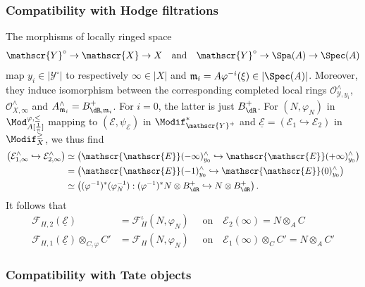 \subsubsection{Compatibility with Hodge filtrations}\label{subsec:CompHodge}

The morphisms of locally ringed space
\[
\mathscr{Y}^{\circ}\rightarrow\mathscr{X}\rightarrow X\quad\text{and}\quad\mathscr{Y}^{\circ}\rightarrow\Spa(A)\rightarrow\Spec(A)
\]
map $y_{i}\in\left|\mathscr{Y}^{\circ}\right|$ to respectively $\infty\in\left|X\right|$ and $\mathfrak{m}_{i}=A\varphi^{-i}(\xi)\in\left|\Spec(A)\right|$. Moreover, they induce isomorphism between the corresponding completed local rings $\mathscr{O}_{\mathscr{Y},y_{i}}^{\wedge}$, $\mathcal{O}_{X,\infty}^{\wedge}$ and $A_{\mathfrak{m}_{i}}^{\wedge}=B_{\dR,\mathfrak{m}_{i}}^{+}$. For $i=0$, the latter is just $B_{\dR}^{+}$. For $(N,\varphi_{N})$ in $\Mod_{A[\frac{1}{\pi}]}^{\varphi,\leq}$ mapping to $(\mathscr{E},\psi_{\mathscr{E}})$ in $\Modif_{\mathscr{Y}^{+}}^{\ast}$ and $\underline{\mathcal{E}}=(\mathcal{E}_{1}\hookrightarrow\mathcal{E}_{2})$ in $\Modif_{X}^{\geq}$, we thus find
\begin{align*}
\left(\mathcal{E}_{1,\infty}^{\wedge}\hookrightarrow\mathcal{E}_{2,\infty}^{\wedge}\right) & \simeq \left(\mathscr{\mathscr{E}}(-\infty)_{y_{0}}^{\wedge}\hookrightarrow\mathscr{\mathscr{E}}(+\infty)_{y_{0}}^{\wedge}\right)\\
& = \left(\mathscr{\mathscr{E}}(-1)_{y_{0}}^{\wedge}\hookrightarrow\mathscr{\mathscr{E}}(0)_{y_{0}}^{\wedge}\right)\\
& \simeq \left((\varphi^{-1})^{\ast}(\varphi_{N}^{-1}):(\varphi^{-1})^{\ast}N\otimes B_{\dR}^{+}\hookrightarrow N\otimes B_{\dR}^{+}\right).
\end{align*}
It follows that
\begin{align*}
\mathcal{F}_{H,2}(\underline{\mathcal{E}}) & = \mathcal{F}_{H}^{\iota}(N,\varphi_{N})\quad\text{ on}\quad\mathcal{E}_{2}(\infty)=N\otimes_{A}C\\
\mathcal{F}_{H,1}(\underline{\mathcal{E}})\otimes_{C,\varphi}C' & = \mathcal{F}_{H}(N,\varphi_{N})\quad\text{ on}\quad\mathcal{E}_{1}(\infty)\otimes_{C}C'=N\otimes_{A}C'
\end{align*}


\subsubsection{Compatibility with Tate objects}\label{subsec:CompTate}

